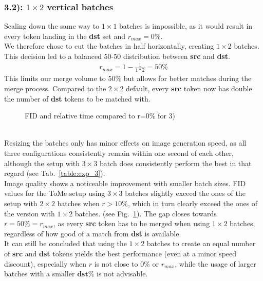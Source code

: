 \subsubsection*{3.2): $1 \times 2$ vertical batches}
Scaling down the same way to $1 \times 1$ batches is impossible, as it would result in every token landing in the \textbf{dst} set and \(r_{max}=0\%\).\\
We therefore chose to cut the batches in half horizontally, creating $1 \times 2$ batches. This decision led to a balanced 50-50 distribution between \textbf{src} and \textbf{dst}.
\begin{align*}
    r_{max} = 1-\frac{1}{1*2} = 50\%
\end{align*}
This limits our merge volume to 50\% but allows for better matches during the merge process. Compared to the $2 \times 2$ default, every \textbf{src} token now has double the number of \textbf{dst} tokens to be matched with.\\
\begin{figure}[!htb]
    
    
\caption{FID and relative time compared to r=0\% for 3)}
\label{fig:exp_3}
\end{figure}\\
Resizing the batches only has minor effects on image generation speed, as all three configurations consistently remain within one second of each other, although the setup with $3 \times 3$ batch does consistently perform the best in that regard (see Tab.~\ref{table:exp_3}).\\
Image quality shows a noticeable improvement with smaller batch sizes. FID values for the ToMe setup using $3 \times 3$ batches slightly exceed the ones of the setup with $2 \times 2$ batches when \(r>10\%\), which in turn clearly exceed the ones of the version with $1 \times 2$ batches. (see Fig.~\ref{fig:exp_3}).
The gap closes towards \(r=50\%=r_{max}\), as every \textbf{src} token has to be merged when using $1 \times 2$ batches, regardless of how good of a match from \textbf{dst} is available.\\
It can still be concluded that using the $1 \times 2$ batches to create an equal number of \textbf{src} and \textbf{dst} tokens yields the best performance (even at a minor speed discount), especially when \(r\) is not close to \(0\%\) or \(r_{max}\), while the usage of larger batches with a smaller \(\textbf{dst\%}\) is not advisable.



